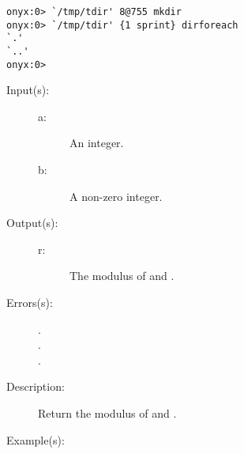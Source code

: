 \begin{description}
\begin{description}
\begin{verbatim}
onyx:0> `/tmp/tdir' 8@755 mkdir
onyx:0> `/tmp/tdir' {1 sprint} dirforeach
`.'
`..'
onyx:0>
		\end{verbatim}
	\end{description}
\label{systemdict:mod}
\item[{\onyxop{a b}{mod}{r}}: ]
	\begin{description}\item[]
	\item[Input(s): ]
		\begin{description}\item[]
		\item[a: ]
			An integer.
		\item[b: ]
			A non-zero integer.
		\end{description}
	\item[Output(s): ]
		\begin{description}\item[]
		\item[r: ]
			The modulus of  and .
		\end{description}
	\item[Errors(s): ]
		\begin{description}\item[]
		\item[.]
		\item[.]
		\item[.]
		\end{description}
	\item[Description: ]
			Return the modulus of  and .
	\item[Example(s): ]\begin{verbatim}


\end{verbatim}
\end{description}
\end{description}
